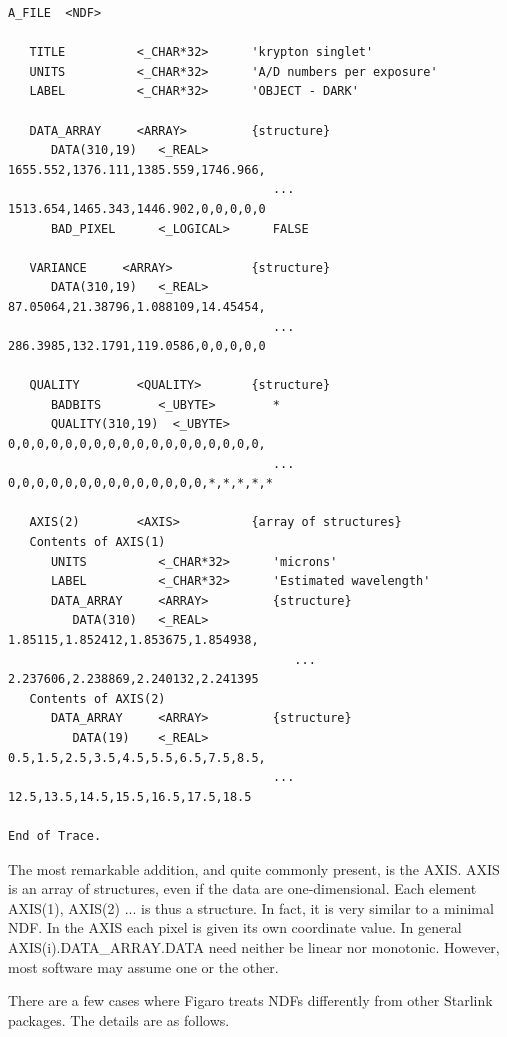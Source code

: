 \begin{verbatim}
A_FILE  <NDF>

   TITLE          <_CHAR*32>      'krypton singlet'
   UNITS          <_CHAR*32>      'A/D numbers per exposure'
   LABEL          <_CHAR*32>      'OBJECT - DARK'

   DATA_ARRAY     <ARRAY>         {structure}
      DATA(310,19)   <_REAL>         1655.552,1376.111,1385.559,1746.966,
                                     ... 1513.654,1465.343,1446.902,0,0,0,0,0
      BAD_PIXEL      <_LOGICAL>      FALSE

   VARIANCE     <ARRAY>           {structure}
      DATA(310,19)   <_REAL>         87.05064,21.38796,1.088109,14.45454,
                                     ... 286.3985,132.1791,119.0586,0,0,0,0,0

   QUALITY        <QUALITY>       {structure}
      BADBITS        <_UBYTE>        *
      QUALITY(310,19)  <_UBYTE>      0,0,0,0,0,0,0,0,0,0,0,0,0,0,0,0,0,0,
                                     ... 0,0,0,0,0,0,0,0,0,0,0,0,0,0,*,*,*,*,*

   AXIS(2)        <AXIS>          {array of structures}
   Contents of AXIS(1)
      UNITS          <_CHAR*32>      'microns'
      LABEL          <_CHAR*32>      'Estimated wavelength'
      DATA_ARRAY     <ARRAY>         {structure}
         DATA(310)   <_REAL>            1.85115,1.852412,1.853675,1.854938,
                                        ... 2.237606,2.238869,2.240132,2.241395
   Contents of AXIS(2)
      DATA_ARRAY     <ARRAY>         {structure}
         DATA(19)    <_REAL>         0.5,1.5,2.5,3.5,4.5,5.5,6.5,7.5,8.5,
                                     ... 12.5,13.5,14.5,15.5,16.5,17.5,18.5

End of Trace.
\end{verbatim}

   The most remarkable addition, and quite commonly present, is the
   AXIS. AXIS is an array of structures, even if the data are
   one-dimensional. Each element AXIS(1), AXIS(2) ... is thus a
   structure. In fact, it is very similar to a minimal NDF. In the AXIS
   each pixel is given its own coordinate value. In general
   AXIS(i).DATA\_ARRAY.DATA need neither be linear nor monotonic.
   However, most software may assume one or the other.

   There are a few cases where Figaro treats NDFs differently from other
   Starlink packages.  The details are as follows.

